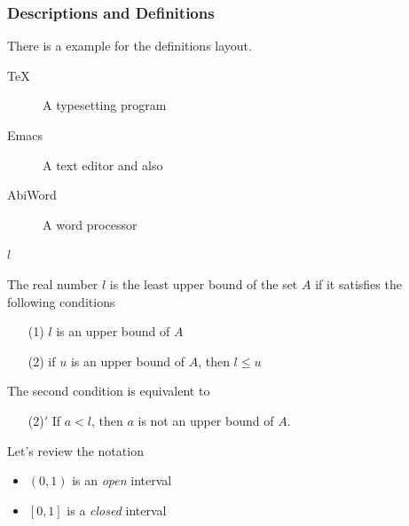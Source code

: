 \documentclass{article}
\theoremstyle{definition}
\theoremstyle{remark}
\theoremstyle{plain}
\numberwithin{equation}{subsection}
\begin{document}
{\subsubsection{Descriptions and Definitions}
There is a example for the definitions layout.
\begin{description}
	\item[\TeX] A typesetting program
	\item[Emacs] A text editor and also
	\item[AbiWord] A word processor
	\item[$l$]
\end{description}
The real number $l$ is the least upper bound of the
set $A$ if it satisfies the following conditions
\begin{enumerate}
	\item[(1)] $l$ is an upper bound of $A$
	\item[(2)] if $u$ is an upper bound of $A$, then $l\le u$
\end{enumerate}
The second condition is equivalent to
\begin{enumerate}
	\item[(2)$'$] If $a<l$, then $a$ is not an upper bound of $A$.
\end{enumerate}
Let’s review the notation
{\renewcommand{\labelitemi}{$\bullet$}
\begin{itemize}
	\item $(0,1)$ is an \emph{open} interval
	\item $[0,1]$ is a \emph{closed} interval
\end{itemize}}
}
\end{document}
